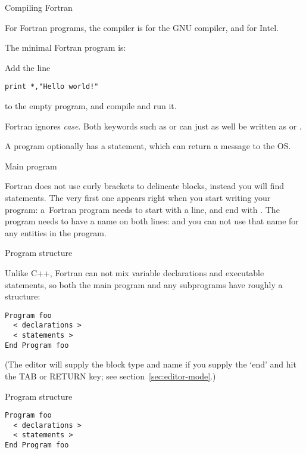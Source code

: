  {Compiling Fortran}

For Fortran programs, the compiler is  for the
GNU compiler, and  for Intel.

The minimal Fortran program is:
%

\begin{exercise}
  Add the line
\begin{lstlisting}
print *,"Hello world!"
\end{lstlisting}
to the empty program, and compile and run it.
\end{exercise}

Fortran ignores \emph{case}.
Both keywords such as  or  can just as well be written as
 or .

A program optionally has a  statement, which can
return a message to the \ac{OS}.
%

 {Main program}

Fortran does not use curly brackets to delineate blocks, instead you
will find  statements. The very first one appears
right when you start writing your program:
a~Fortran program needs to start with a  line, and end with
. The program needs to have a name on both lines:
%
%
and you can not use that name for any entities in the program.

 {Program structure}

Unlike C++, Fortran can not mix variable declarations and executable
statements, so both the main program and any subprograms have roughly
a
structure:
\begin{lstlisting}
Program foo
  < declarations >
  < statements >
End Program foo
\end{lstlisting}
(The  editor will supply the block type and name if
you supply the `end' and hit the TAB or RETURN key; see
section~\ref{sec:editor-mode}.)

\begin{slide}{Program structure}
  \label{sl:programf}
\begin{lstlisting}
Program foo
  < declarations >
  < statements >
End Program foo
\end{lstlisting}
\end{slide}

